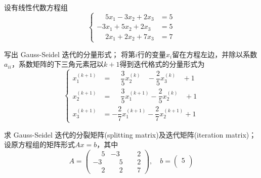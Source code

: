 \documentclass[11pt]{article}
\begin{document}
\begin{question}
    \questiontext
    {
        设有线性代数方程组
        \begin{equation*}
            \left\{
            \begin{aligned}
                \phantom{-}5x_1 - 3x_2 + 2x_3 & = 5 \\
                -3x_1 + 5x_2 + 2x_3           & = 5 \\
                \phantom{-}2x_1 + 2x_2 + 7x_3 & = 7
            \end{aligned}
            \right.
        \end{equation*}
    }
    \begin{subquestion}{写出 Gauss-Seidel 迭代的分量形式；}
        \answer
        {
            将第$i$行的变量$x_i$留在方程左边，并除以系数$a_{ii}$，系数矩阵的下三角元素冠以$k+1$得到迭代格式的分量形式为
            \begin{equation*}
                \left\{
                \begin{aligned}
                    x_1^{(k + 1)} & = \phantom{-}\dfrac{3}{5}x_2^{(k)\phantom{+1}} - \dfrac{2}{5}x_3^{(k)\phantom{+1}} + 1 \\
                    x_2^{(k + 1)} & = \phantom{-}\dfrac{3}{5}x_1^{(k + 1)} - \dfrac{2}{5}x_2^{(k)\phantom{+1}} + 1         \\
                    x_3^{(k + 1)} & = -\dfrac{2}{7}x_1^{(k + 1)} - \dfrac{2}{7}x_2^{(k + 1)} + 1
                \end{aligned}
                \right.
            \end{equation*}
        }
    \end{subquestion}
    \begin{subquestion}{求 Gauss-Seidel 迭代的分裂矩阵(splitting matrix)及迭代矩阵(iteration matrix)；}
        \answer
        {
            设原方程组的矩阵形式$Ax = b$，其中
            \begin{equation*}
                A =
                \begin{pmatrix}
                    \phantom{-}5 & -3           & \phantom{-}2 \\
                    -3           & \phantom{-}5 & \phantom{-}2 \\
                    \phantom{-}2 & \phantom{-}2 & \phantom{-}7
                \end{pmatrix}
                ,\quad
                b =
                \begin{pmatrix}
                    5 \\

\end{pmatrix}
\end{equation*}}
\end{subquestion}
\end{question}
\end{document}
